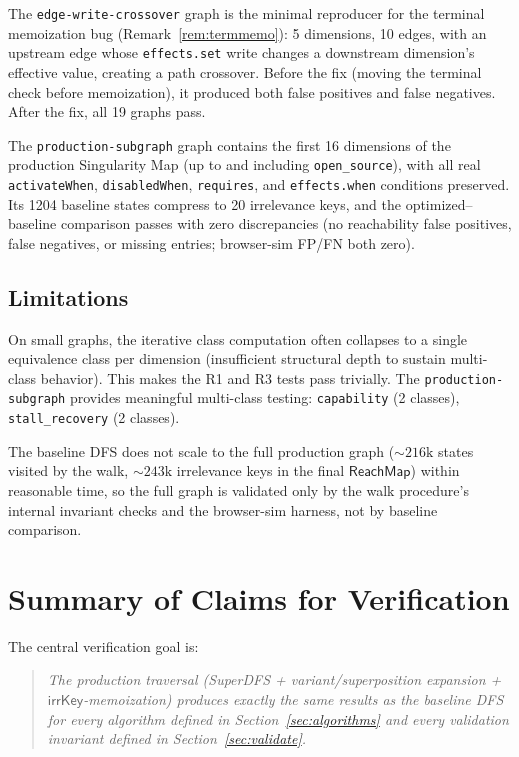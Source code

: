 \documentclass[11pt]{article}
\theoremstyle{definition}
\newcommand{\ik}{\mathsf{irrKey}}      %
\begin{document}
The \texttt{edge-write-crossover} graph is the minimal reproducer for
the terminal memoization bug (Remark~\ref{rem:termmemo}): 5 dimensions,
10 edges, with an upstream edge whose \texttt{effects.set}
write changes a downstream dimension's effective value, creating a
path crossover. Before the fix (moving the terminal check before
memoization), it produced both false positives and false negatives.
After the fix, all 19 graphs pass.

The \texttt{production-subgraph} graph contains the first 16 dimensions
of the production Singularity Map (up to and including
\texttt{open\_source}), with all real \texttt{activateWhen},
\texttt{disabledWhen}, \texttt{requires}, and
\texttt{effects.when} conditions preserved. Its 1204 baseline states compress to 20 irrelevance
keys, and the optimized--baseline comparison passes with zero
discrepancies (no reachability false positives, false negatives, or
missing entries; browser-sim FP/FN both zero).

\subsection{Limitations}

On small graphs, the iterative class computation often collapses to a
single equivalence class per dimension (insufficient structural depth to
sustain multi-class behavior). This makes the R1 and R3 tests pass
trivially. The \texttt{production-subgraph} provides meaningful
multi-class testing: \texttt{capability} (2 classes),
\texttt{stall\_recovery} (2 classes).

The baseline DFS does not scale to the full production graph
(${\sim}216\text{k}$ states visited by the walk, ${\sim}243\text{k}$
irrelevance keys in the final $\mathsf{ReachMap}$) within reasonable
time, so the full graph is validated only by the \textsf{walk}
procedure's internal invariant checks and the browser-sim harness, not
by baseline comparison.


\section{Summary of Claims for Verification}\label{sec:summary}

The central verification goal is:

\begin{quote}
\emph{The production traversal (SuperDFS + variant/superposition
expansion + $\ik$-memoization) produces exactly the same results as the
baseline DFS for every algorithm defined in Section~\ref{sec:algorithms}
and every validation invariant defined in Section~\ref{sec:validate}.}
\end{quote}
\end{document}

